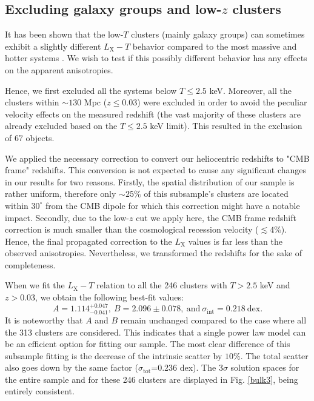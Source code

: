 \documentclass{aa}   %
\begin{document}
\subsection{Excluding galaxy groups and low-$z$ clusters}\label{low_T_z_clusters}

It has been shown that the low-$T$ clusters (mainly galaxy groups) can sometimes exhibit a slightly different $L_{\text{X}}-T$ behavior compared to the most massive and hotter systems \citep[e.g.,][and references therein]{lovisari}. We wish to test if this possibly different behavior has any effects on the apparent anisotropies.

Hence, we first excluded all the systems below $T\leq 2.5$ keV. Moreover, all the clusters within $\sim 130$ Mpc ($z\leq 0.03$) were excluded in order to avoid the peculiar velocity effects on the measured redshift (the vast majority of these clusters are already excluded based on the $T\leq 2.5$ keV limit). This resulted in the exclusion of 67 objects. 

We applied the necessary correction to convert our heliocentric redshifts to "CMB frame" redshifts. This conversion is not expected to cause any significant changes in our results for two reasons. Firstly, the spatial distribution of our sample is rather uniform, therefore only $\sim 25\%$ of this subsample's clusters are located within $30^{\circ}$ from the CMB dipole for which this correction might have a notable impact. Secondly, due to the low-$z$ cut we apply here, the CMB frame redshift correction is much smaller than the cosmological recession velocity ($\lesssim 4\%$). Hence, the final propagated correction to the $L_{\text{X}}$ values is far less than the observed anisotropies. Nevertheless, we transformed the redshifts for the sake of completeness.

When we fit the $L_{\text{X}}-T$ relation to all the 246 clusters with $T> 2.5$ keV and $z>0.03$, we obtain the following best-fit values: 
\begin{equation}
A=1.114^{+0.047}_{-0.041}, \ B=2.096\pm 0.078, \ \text{and}\ \sigma_{\text{int}}=0.218\ \text{dex}.
\end{equation}
It is noteworthy that $A$ and $B$ remain unchanged compared to the case where all the 313 clusters are considered. This indicates that a single power law model can be an efficient option for fitting our sample. The most clear difference of this subsample fitting is the decrease of the intrinsic scatter by $10\%$. The total scatter also goes down by the same factor ($\sigma_{\text{tot}}$=0.236 dex).  The $3\sigma$ solution spaces for the entire sample and for these 246 clusters are displayed in Fig. \ref{bulk3}, being entirely consistent.
 
\end{document}
